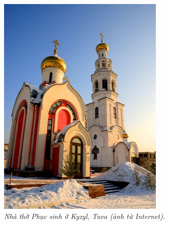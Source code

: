 \begin{multicols}{2}
\begin{figure}[H]
		\includegraphics[width= 1\linewidth]{4a}
		\caption{\small\textit{\color{quantoan}Nhà thờ Phục sinh ở Kyzyl, Tuva (ảnh từ Internet).}}
	\end{figure}
\end{multicols}